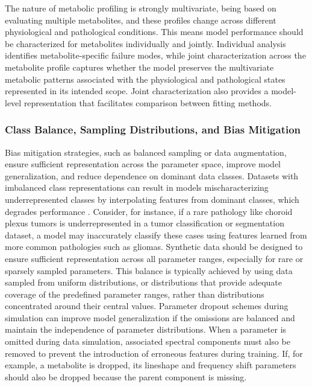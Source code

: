 The nature of metabolic profiling is strongly multivariate, being based on evaluating multiple metabolites, and these profiles change across different physiological and pathological conditions. This means model performance should be characterized for metabolites individually and jointly. Individual analysis identifies metabolite-specific failure modes, while joint characterization across the metabolite profile captures whether the model preserves the multivariate metabolic patterns associated with the physiological and pathological states represented in its intended scope. Joint characterization also provides a model-level representation that facilitates comparison between \DL fitting methods.

\subsubsection{Class Balance, Sampling Distributions, and Bias Mitigation}
Bias mitigation strategies, such as balanced sampling or data augmentation, ensure sufficient representation across the parameter space, improve model generalization, and reduce dependence on dominant data classes. Datasets with imbalanced class representations can result in models mischaracterizing underrepresented classes by interpolating features from dominant classes, which degrades performance \cite{Geirhos2020}. Consider, for instance, if a rare pathology like choroid plexus tumors is underrepresented in a tumor classification or segmentation dataset, a model may inaccurately classify these cases using features learned from more common pathologies such as gliomas. Synthetic data should be designed to ensure sufficient representation across all parameter ranges, especially for rare or sparsely sampled parameters. This balance is typically achieved by using data sampled from uniform distributions, or distributions that provide adequate coverage of the predefined parameter ranges, rather than distributions concentrated around their central values. Parameter dropout schemes during simulation can improve model generalization if the omissions are balanced and maintain the independence of parameter distributions. When a parameter is omitted during data simulation, associated spectral components must also be removed to prevent the introduction of erroneous features during training. If, for example, a metabolite is dropped, its lineshape and frequency shift parameters should also be dropped because the parent component is missing.

